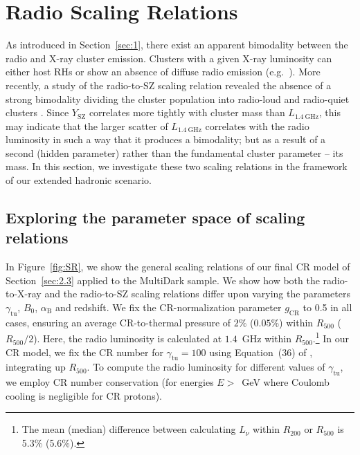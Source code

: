 \documentclass[traditabstract]{aa}
\newcommand{\rmn}{\mathrm}
\begin{document}
\section{Radio Scaling Relations}
\label{sec:4}
As introduced in Section~\ref{sec:1}, there exist an apparent bimodality between
the radio and X-ray cluster emission. Clusters with a given X-ray luminosity can
either host RHs or show an absence of diffuse radio emission
(e.g.~\citealp{2009A&A...507..661B,2011A&A...527A..99E}). More recently, a study
of the radio-to-SZ scaling relation revealed the absence of a strong bimodality
dividing the cluster population into radio-loud and radio-quiet clusters
\citep{2012MNRAS.421L.112B}. Since $Y_{\rmn{SZ}}$ correlates more tightly with
cluster mass than $L_{1.4~\rmn{GHz}}$, this may indicate that the larger scatter
of $L_{1.4~\rmn{GHz}}$ correlates with the radio luminosity in such a way that
it produces a bimodality; but as a result of a second (hidden parameter) rather
than the fundamental cluster parameter -- its mass. In this section, we
investigate these two scaling relations in the framework of our extended
hadronic scenario.


\subsection{Exploring the parameter space of scaling relations}

In Figure~\ref{fig:SR}, we show the general scaling relations of our final CR
model of Section~\ref{sec:2.3} applied to the MultiDark sample. We show how both
the radio-to-X-ray and the radio-to-SZ scaling relations differ upon varying the
parameters $\gamma_{\rmn{tu}}$, $B_{0}$, $\alpha_{\rmn{B}}$ and redshift. We fix
the CR-normalization parameter $g_{\rmn{CR}}$ to 0.5 in all cases, ensuring an
average CR-to-thermal pressure of $2\%$ ($0.05\%$) within $R_{500}$
($R_{500}/2$). Here, the radio luminosity is calculated at $1.4$~GHz within
$R_{500}.$\footnote{The mean (median) difference between calculating $L_{\nu}$
  within $R_{200}$ or $R_{500}$ is 5.3\% (5.6\%).}  In our CR model, we fix the
CR number for $\gamma_{\rmn{tu}}=100$ using Equation~(36) of
\cite{2011A&A...527A..99E}, integrating up $R_{500}$. To compute the radio
luminosity for different values of $\gamma_{\rmn{tu}}$, we employ CR number
conservation (for energies $E>$~GeV where Coulomb cooling is negligible for CR
protons).
\end{document}
